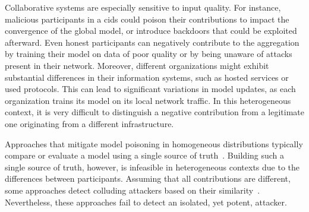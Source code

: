 Collaborative systems are especially sensitive to input quality.
For instance, malicious participants in a \gls{cids} could poison their contributions to impact the convergence of the global model, or introduce backdoors that could be exploited afterward.
Even honest participants can negatively contribute to the aggregation by training their model on data of poor quality or by being unaware of attacks present in their network.  
Moreover, different organizations might exhibit substantial differences in their information systems, such as hosted services or used protocols.
This can lead to significant variations in model updates, as each organization trains its model on its local network traffic.
In this heterogeneous context, it is very difficult to distinguish a negative contribution from a legitimate one originating from a different infrastructure.


Approaches that mitigate model poisoning in homogeneous distributions typically compare or evaluate a model using a single source of truth~\cite{blanchard_machine_2017,cao_fltrust_2022}.
Building such a single source of truth, however, is infeasible in heterogeneous contexts due to the differences between participants. 
Assuming that all contributions are different, some approaches detect colluding attackers based on their similarity~\cite{fung_limitations_2020, awan_contra_2021}. 
Nevertheless, these approaches fail to detect an isolated, yet potent, attacker.



